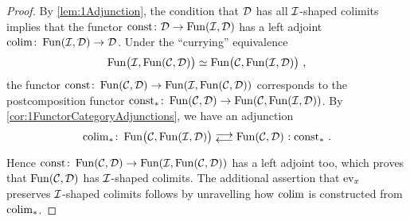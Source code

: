\begin{proof}
	By \cref{lem:1Adjunction}, the condition that $\mathcal{D}$ has all $\mathcal{I}$-shaped colimits implies that the functor $\operatorname{const}\colon \mathcal{D}\rightarrow \operatorname{Fun}(\mathcal{I},\mathcal{D})$ has a left adjoint $\operatorname*{colim}\colon \operatorname{Fun}(\mathcal{I},\mathcal{D})\rightarrow \mathcal{D}$. Under the \enquote{currying} equivalence
	\begin{equation*}
		\Fun\lef(\Ii,\Fun(\Cc,\Dd)\righ)\simeq \Fun\lef(\Cc,\Fun(\Ii,\Dd)\righ)\,,
	\end{equation*}
	the functor $\operatorname{const}\colon \operatorname{Fun}(\mathcal{C},\mathcal{D})\rightarrow \operatorname{Fun}(\mathcal{I},\operatorname{Fun}(\mathcal{C},\mathcal{D}))$ corresponds to the postcomposition functor $\operatorname{const}_*\colon \operatorname{Fun}(\mathcal{C},\mathcal{D})\rightarrow \operatorname{Fun}(\mathcal{C},\operatorname{Fun}(\mathcal{I},\mathcal{D}))$. By \cref{cor:1FunctorCategoryAdjunctions}, we have an adjunction
	\begin{equation*}
		{\colimit}_*\colon \Fun\lef(\Cc,\Fun(\Ii,\Dd)\righ)\doublelrmorphism\Fun(\Cc,\Dd)\noloc \const_*\,.
	\end{equation*}
	Hence $\operatorname{const}\colon \operatorname{Fun}(\mathcal{C},\mathcal{D})\rightarrow \operatorname{Fun}(\mathcal{I},\operatorname{Fun}(\mathcal{C},\mathcal{D}))$ has a left adjoint too, which proves that $\operatorname{Fun}(\mathcal{C},\mathcal{D})$ has $\mathcal{I}$-shaped colimits. The additional assertion that $\operatorname{ev}_x$ preserves $\mathcal{I}$-shaped colimits follows by unravelling how $\operatorname*{colim}$ is constructed from $\operatorname*{colim}_*$.
\end{proof}
